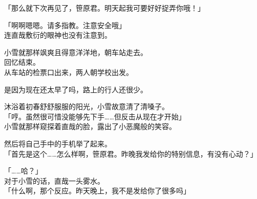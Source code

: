 「那么就下次再见了，笹原君。明天起我可要好好捉弄你哦！」

「啊啊嗯嗯。请多指教。注意安全哦」\\

连直哉敷衍的眼神也没有注意到。

小雪就那样飒爽且得意洋洋地，朝车站走去。\\

% 


回忆结束。\\

从车站的检票口出来，两人朝学校出发。

是因为现在还太早了吗，路上的行人还很少。

沐浴着初春舒舒服服的阳光，小雪故意清了清嗓子。\\

「哼。虽然很可惜没能够先下手……但反击从现在才开始」\\

小雪就那样窥探着直哉的脸，露出了小恶魔般的笑容。

然后将自己手中的手机举了起来。\\

「首先是这个……怎么样啊，笹原君。昨晚我发给你的特别信息，有没有心动？」

「……哈？」\\

对于小雪的话，直哉一头雾水。\\

「什么啊，那个反应。昨天晚上，我不是发给你了很多吗」

